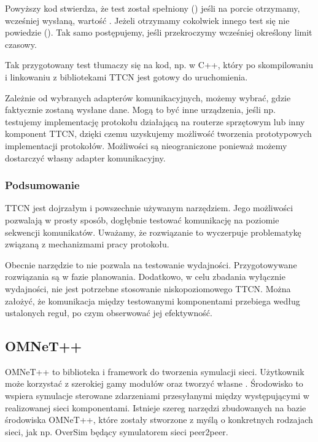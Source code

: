 \documentclass[00-praca-magisterska.tex]{subfiles}
\begin{document}
Powyższy kod stwierdza, że test został spełniony ()
jeśli na porcie  otrzymamy, wcześniej wysłaną, wartość .
Jeżeli otrzymamy cokolwiek innego test się nie powiedzie
().  Tak samo postępujemy, jeśli przekroczymy wcześniej
określony limit czasowy.

Tak przygotowany test tłumaczy się na kod, np. w C++, który po skompilowaniu i
linkowaniu z bibliotekami TTCN jest gotowy do uruchomienia.

Zależnie od wybranych adapterów komunikacyjnych, możemy wybrać, gdzie
faktycznie zostaną wysłane dane. Mogą to być inne urządzenia, jeśli np.
testujemy implementację protokołu działającą na routerze sprzętowym lub inny
komponent TTCN, dzięki czemu uzyskujemy możliwość tworzenia prototypowych
implementacji protokołów. Możliwości są nieograniczone ponieważ możemy
dostarczyć własny adapter komunikacyjny.

\subsubsection{Podsumowanie}

TTCN jest dojrzałym i powszechnie używanym narzędziem. Jego możliwości pozwalają
w prosty sposób, dogłębnie testować komunikację na poziomie sekwencji
komunikatów. Uważamy, że rozwiązanie to wyczerpuje problematykę związaną z
mechanizmami pracy protokołu.

Obecnie narzędzie to nie pozwala na testowanie wydajności. Przygotowywane
rozwiązania są w fazie planowania. Dodatkowo, w celu zbadania wyłącznie
wydajności, nie jest potrzebne stosowanie niskopoziomowego TTCN. Można założyć,
że komunikacja między testowanymi komponentami przebiega według ustalonych
reguł, po czym obserwować jej efektywność.

\subsection{OMNeT++}
\label{omnet}

OMNeT++ to biblioteka i framework do tworzenia symulacji sieci. Użytkownik może korzystać z
szerokiej gamy modułów oraz tworzyć własne \cite{omnet-main}. Środowisko to
wspiera symulacje sterowane zdarzeniami przesyłanymi między występującymi w
realizowanej sieci komponentami. Istnieje szereg narzędzi zbudowanych na bazie
środowiska OMNeT++, które zostały stworzone z myślą o konkretnych rodzajach
sieci, jak np. OverSim będący symulatorem sieci peer2peer.
\end{document}
